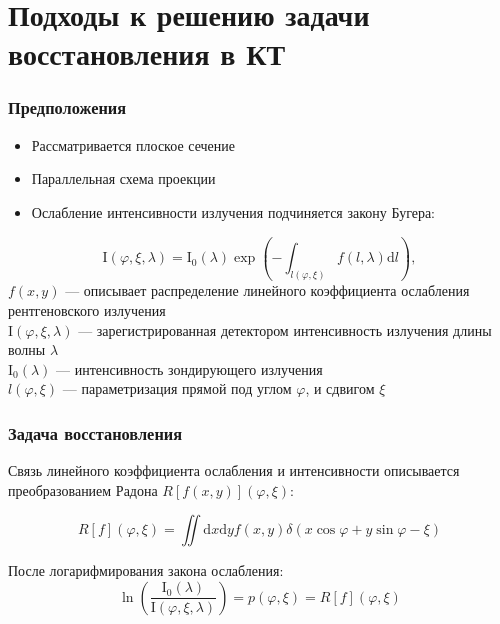 \documentclass[12pt]{beamer}
\begin{document}
\section{Подходы к решению задачи восстановления в КТ}

\begin{frame}
\frametitle{Предположения}
\begin{itemize}
  \item Рассматривается плоское сечение
  \item Параллельная схема проекции
  \item Ослабление интенсивности излучения подчиняется закону Бугера:
\end{itemize}
  $$
  \mathrm I \left( \varphi, \xi , \lambda \right) = \mathrm I_0(\lambda) \exp\left( {-\int_{l(\varphi, \xi)} \! f(l, \lambda) \mathrm d l }\right),
  $$
  \small
  $f(x, y)$ ---  описывает распределение линейного коэффициента ослабления рентгеновского излучения \\
  $\mathrm I(\varphi, \xi, \lambda)$ --- зарегистрированная детектором интенсивность излучения длины волны $\lambda$ \\
  $\mathrm I_0(\lambda)$ --- интенсивность зондирующего излучения \\
  $l(\varphi, \xi)$ --- параметризация прямой под углом $\varphi$, и сдвигом $\xi$ \\
\end{frame}

\begin{frame}
\frametitle{Задача восстановления}
  Связь линейного коэффициента ослабления и интенсивности описывается преобразованием Радона $R[f(x,y)](\varphi, \xi)$:

  $$
  R[f](\varphi, \xi) = 
 \iint \! \mathrm d x \mathrm d y f(x,y)\delta(x\cos\varphi + y\sin\varphi - \xi)
  $$


  После логарифмирования закона ослабления:
  $$
  \ln \left (\frac{\mathrm I_0(\lambda)}{\mathrm I(\varphi, \xi, \lambda)} \right) = p(\varphi, \xi) = R[f](\varphi, \xi)
  $$

\end{frame}
\end{document}
